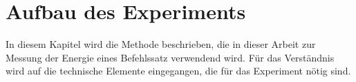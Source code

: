 \chapter{Aufbau des Experiments}

In diesem Kapitel wird die Methode beschrieben, die in dieser Arbeit zur Messung der Energie eines Befehlssatz verwendend wird. Für das Verständnis wird auf die technische Elemente eingegangen, die für das Experiment nötig sind.